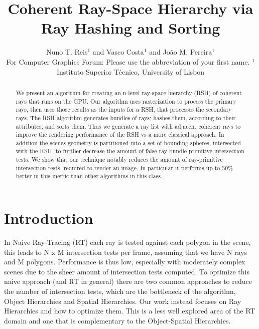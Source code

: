 \documentclass{egpubl}
\title[Coherent Ray-Space Hierarchy via Ray Hashing and Sorting]
      {Coherent Ray-Space Hierarchy via Ray Hashing and Sorting}
\author[Nuno T. Reis \& Vasco Costa \& Jo\~{a}o M. Pereira]
       {Nuno T. Reis$^{1}$
        and Vasco Costa$^{1}$
        and Jo\~{a}o M. Pereira$^{1}$
        \\
 For Computer Graphics Forum: Please use the abbreviation of your first name.
$^1$Instituto Superior T\'{e}cnico, University of Lisbon\\
       }
\begin{document}

\maketitle

\begin{abstract}

We present an algorithm for creating an n-level ray-space hierarchy (RSH) of coherent rays that runs on the GPU. Our algorithm uses rasterization to process the primary rays, then uses those results as the inputs for a RSH, that processes the secondary rays. The RSH algorithm generates bundles of rays; hashes them, according to their attributes; and sorts them. Thus we generate a ray list with adjacent coherent rays to improve the rendering performance of the RSH vs a more classical approach. In addition the scenes geometry is partitioned into a set of bounding spheres, intersected with the RSH, to further decrease the amount of false ray bundle-primitive intersection tests. We show that our technique notably reduces the amount of ray-primitive intersection tests, required to render an image. In particular it performs up to 50\% better in this metric than other algorithms in this class.


\begin{classification} %
\end{classification}

\end{abstract}

\section{Introduction}

In Naive Ray-Tracing (RT) each ray is tested against each polygon in the scene, this leads to N x M intersection tests per frame, assuming that we have N rays and M polygons. Performance is thus low, especially with moderately complex scenes due to the sheer amount of intersection tests computed. To optimize this naive approach (and RT in general) there are two common approaches to reduce the number of intersection tests, which are the bottleneck of the algorithm, Object Hierarchies and Spatial Hierarchies. Our work instead focuses on Ray Hierarchies and how to optimize them. This is a less well explored area of the RT domain and one that is complementary to the Object-Spatial Hierarchies.
\end{document}
